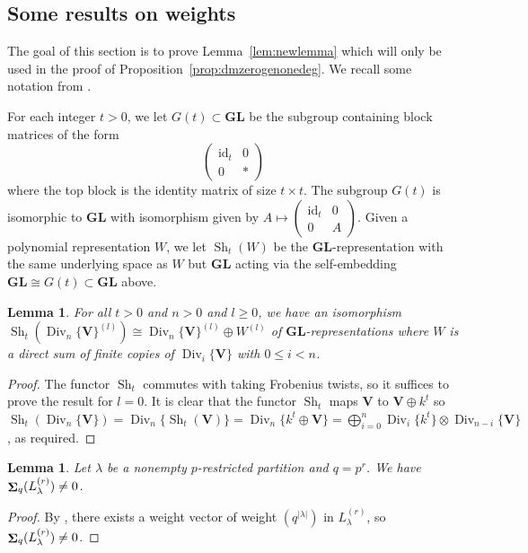 \documentclass[12pt]{amsart}
\newcommand{\bV}{\mathbf{V}}
\DeclareMathOperator{\Div}{Div}
\newcommand{\id}{\mathrm{id}}
\DeclareMathOperator{\Sh}{\bf{\Sigma}}
\DeclareMathOperator{\nSh}{Sh}
\newcommand{\mShq}{\Sh_{q}}
\newcommand{\GL}{\mathbf{GL}}
\numberwithin{equation}{section}
\newtheorem{lemma}[equation]{Lemma}
\theoremstyle{definition}
\theoremstyle{plain}
\begin{document}
\subsection{Some results on weights}\label{ss:technical}
The goal of this section is to prove Lemma~\ref{lem:newlemma} which will only be used in the proof of Proposition~\ref{prop:dmzerogenonedeg}. We recall some notation from \cite[Section~4]{gan25pol}.

For each integer $t > 0$, we let $G(t) \subset \GL$ be the subgroup containing block matrices of the form
$$\begin{pmatrix}
    \id_t & 0 \\
    0 & * 
\end{pmatrix}$$
where the top block is the identity matrix of size $t \times t$. 
The subgroup $G(t)$ is isomorphic to $\GL$ with isomorphism given by $A \mapsto \begin{pmatrix}
    \id_t & 0 \\ 0 & A
\end{pmatrix}$. 
Given a polynomial representation $W$, we let $\nSh_t(W)$ be the $\GL$-representation  with the same underlying space as $W$ but $\GL$ acting via the self-embedding $\GL \cong G(t) \subset \GL$ above. 

\begin{lemma}\label{lem:shiftdiv}
For all $t > 0$ and $n > 0$ and $l \geq 0$, we have an isomorphism $\nSh_t(\Div_n\{\bV\}^{(l)}) \cong \Div_n\{\bV\}^{(l)} \oplus W^{(l)}$ of $\GL$-representations where $W$ is a direct sum of finite copies of $\Div_i\{\bV\}$ with $0 \leq i < n$.
\end{lemma}
\begin{proof}
The functor $\nSh_t$ commutes with taking Frobenius twists, so it suffices to prove the result for $l = 0$. 
It is clear that the functor $\nSh_t$ maps $\bV$ to $\bV \oplus k^t$ so $\nSh_t(\Div_n\{\bV\}) = \Div_n\{\nSh_t(\bV)\} = \Div_n\{k^t \oplus \bV\} = \bigoplus_{i = 0}^n \Div_i\{k^t\} \otimes \Div_{n-i}\{\bV\}$, as required.
\end{proof}

\begin{lemma}\label{lem:premet}
    Let $\lambda$ be a nonempty $p$-restricted partition and $q = p^r$. We have $\mShq(L_{\lambda}^{(r)}) \ne 0$.
\end{lemma}
\begin{proof}
   By \cite[Proposition~4.4]{gan25pol}, there exists a weight vector of weight $(q^{|\lambda|})$ in $L_{\lambda}^{(r)}$, so $\mShq(L_{\lambda}^{(r)}) \ne 0$.
\end{proof}
\end{document}
